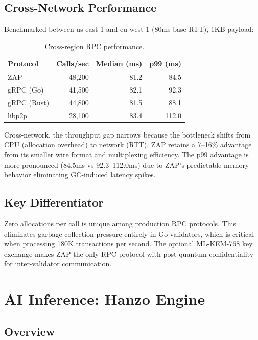\documentclass[11pt,twocolumn]{article}
\begin{document}
\subsection{Cross-Network Performance}

Benchmarked between us-east-1 and eu-west-1 (80ms base RTT), 1KB payload:

\begin{table}[H]
\centering
\caption{Cross-region RPC performance.}
\footnotesize
\begin{tabular}{@{}lrrr@{}}
\toprule
Protocol & Calls/sec & Median (ms) & p99 (ms) \\
\midrule
ZAP & 48,200 & 81.2 & 84.5 \\
gRPC (Go) & 41,500 & 82.1 & 92.3 \\
gRPC (Rust) & 44,800 & 81.5 & 88.1 \\
libp2p & 28,100 & 83.4 & 112.0 \\
\bottomrule
\end{tabular}
\end{table}

Cross-network, the throughput gap narrows because the bottleneck shifts from CPU (allocation overhead) to network (RTT). ZAP retains a 7--16\% advantage from its smaller wire format and multiplexing efficiency. The p99 advantage is more pronounced (84.5ms vs 92.3--112.0ms) due to ZAP's predictable memory behavior eliminating GC-induced latency spikes.

\subsection{Key Differentiator}

Zero allocations per call is unique among production RPC protocols. This eliminates garbage collection pressure entirely in Go validators, which is critical when processing 180K transactions per second. The optional ML-KEM-768 key exchange makes ZAP the only RPC protocol with post-quantum confidentiality for inter-validator communication.

\section{AI Inference: Hanzo Engine}
\label{sec:inference}

\subsection{Overview}
\end{document}
